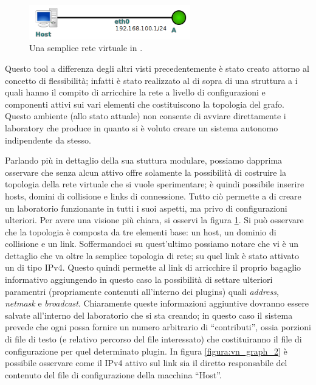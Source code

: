 \begin{figure}[!ht]
	\centering
	\includegraphics[width=7cm]{images/visualnetkit_graph_1.png}
	\caption{Una semplice rete virtuale in \visualnetkit{}.}
	\label{figura:vn_graph_1}
\end{figure}

Questo tool a differenza degli altri visti precedentemente è stato creato attorno al concetto di flessibilità; infatti \visualnetkit è stato realizzato al di sopra di una struttura a \plugin{} i quali hanno il compito di arricchire la rete a livello di configurazioni e componenti attivi sui vari elementi che costituiscono la topologia del grafo. Questo ambiente (allo stato attuale) non consente di avviare direttamente i laboratory che produce in quanto si è voluto creare un sistema autonomo indipendente da \netkit{} stesso.

Parlando più in dettaglio della sua stuttura modulare, possiamo dapprima osservare che \visualnetkit{} senza alcun \plugin{} attivo offre solamente la possibilità di costruire la topologia della rete virtuale che si vuole sperimentare; è quindi possibile inserire hosts, domini di collisione e links di connessione. Tutto ciò permette a \visualnetkit{} di creare un laboratorio funzionante in tutti i suoi aspetti, ma privo di configurazioni ulteriori.
Per avere una visione più chiara, si osservi la figura \ref{figura:vn_graph_1}. Si può osservare che la topologia è composta da tre elementi base: un host, un dominio di collisione e un link. Soffermandoci su quest'ultimo possiamo notare che vi è un dettaglio che va oltre la semplice topologia di rete; su quel link è stato attivato un \plugin{} di tipo IPv4. Questo quindi permette al link di arricchire il proprio bagaglio informativo aggiungendo in questo caso la possibilità di settare ulteriori paramentri (propriamente contenuti all'interno dei plugins) quali \emph{address}, \emph{netmask} e \emph{broadcast}. Chiaramente queste informazioni aggiuntive dovranno essere salvate all'interno del laboratorio che si sta creando; in questo caso il sistema prevede che ogni \plugin{} possa fornire un numero arbitrario di ``contributi'', ossia porzioni di file di testo (e relativo percorso del file interessato) che costituiranno il file di configurazione per quel determinato plugin. In figura \ref{figura:vn_graph_2} è possibile osservare come il \plugin{} IPv4 attivo sul link sia il diretto responsabile del contenuto del file di configurazione della macchina ``Host''.

